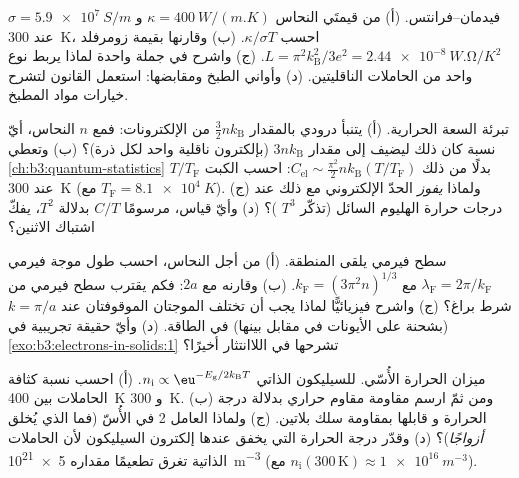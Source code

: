 \begin{exercise}[$\star\star$]\label{exo:b3:electrons-in-solids:5}
فيدمان--فرانتس. (أ) من قيمتَي النحاس $\kappa =
\qty{400}{W/(m.K)}$ و $\sigma = \qty{5.9e7}{S/m}$ عند
\qty{300}{K}، احسب $\kappa/\sigma T$. (ب) وقارنها بقيمة
زومرفلد $L = \pi^2k_{\text{B}}^2/3e^2 =
\qty{2.44e-8}{W.\ohm/K^2}$. (ج) واشرح في جملة واحدة لماذا يربط نوع
واحد من الحاملات الناقليتين. (د) وأواني الطبخ
ومقابضها: استعمل القانون لتشرح خيارات مواد
المطبخ.
\end{exercise}

\begin{exercise}[$\star\star$]\label{exo:b3:electrons-in-solids:6}
تبرئة السعة الحرارية. (أ) يتنبأ درودي بالمقدار
$\tfrac32nk_{\text{B}}$ من الإلكترونات: فمع $n$ النحاس،
أيّ نسبة كان ذلك ليضيف إلى مقدار 
$3nk_{\text{B}}$ (بإلكترون ناقلية واحد لكل ذرة)؟ (ب)
وتعطي \cref{ch:b3:quantum-statistics} بدلًا من ذلك $C_{\text{el}}
\sim \tfrac{\pi^2}{2}nk_{\text{B}}(T/T_{\text{F}})$: احسب
الكبت $T/T_{\text{F}}$ عند \qty{300}{K}
(مع $T_{\text{F}} = \qty{8.1e4}{K}$). (ج) ولماذا \emph{يفوز}
الحدّ الإلكتروني مع ذلك عند درجات حرارة الهليوم السائل
(تذكّر $T^3$ )؟ (د) وأيّ قياس، مرسومًا
$C/T$ بدلالة $T^2$، يفكّ اشتباك الاثنين؟
\end{exercise}

\begin{exercise}[$\star\star$]\label{exo:b3:electrons-in-solids:7}
سطح فيرمي يلقى المنطقة. (أ) من أجل النحاس، احسب
طول موجة فيرمي $\lambda_{\text{F}} = 2\pi/k_{\text{F}}$ مع
$k_{\text{F}} = (3\pi^2n)^{1/3}$. (ب) وقارنه مع $2a$: فكم
يقترب سطح فيرمي من شرط براغ؟ (ج) واشرح
فيزيائيًّا لماذا يجب أن تختلف الموجتان الموقوفتان عند $k = \pi/a$ (بشحنة على
الأيونات في مقابل بينها) في الطاقة. (د) وأيّ حقيقة
تجريبية في \cref{exo:b3:electrons-in-solids:1} تشرحها
 في اللاانتثار أخيرًا؟
\end{exercise}

\begin{exercise}[$\star\star$]\label{exo:b3:electrons-in-solids:8}
ميزان الحرارة الأُسّي. للسيليكون الذاتي $n_{\text{i}}
\propto \eu^{-E_{\text{g}}/2k_{\text{B}}T}$. (أ) احسب
نسبة كثافة الحاملات بين \qty{400}{K} و \qty{300}{K}. (ب)
ومن ثمّ ارسم مقاومة مقاوم حراري بدلالة درجة الحرارة و
قابلها بمقاومة سلك بلاتين. (ج) ولماذا العامل 2 في
الأُسّ (فما الذي يُخلق \emph{أزواجًا})؟ (د) وقدّر
درجة الحرارة التي يخفق عندها إلكترون السيليكون لأن الحاملات
الذاتية تغرق تطعيمًا مقداره \qty{5e21}{m^{-3}}
(مع $n_{\text{i}}(300\,\text{K}) \approx \qty{1e16}{m^{-3}}$).
\end{exercise}

